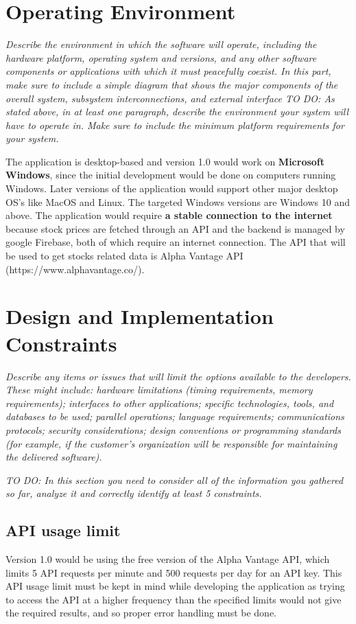 \documentclass[12 pt, a4paper]{report}
\begin{document}
	\section {Operating Environment}
	\textit{Describe the environment in which the software will operate, including the hardware platform, operating system and versions, and any other software components or applications with which it must peacefully coexist. In this part, make sure to include a simple diagram that shows the major components of the overall system, subsystem interconnections, and external interface
	TO DO: As stated above, in at least one paragraph, describe the environment your system will have to operate in. Make sure to include the minimum platform requirements for your system.}



	The application is desktop-based and version 1.0 would work on \textbf{Microsoft Windows}, since the initial development would be done on computers running Windows. Later versions of the application would support other major desktop OS's like MacOS and Linux. The targeted Windows versions are Windows 10 and above. The application would require \textbf{a stable connection to the internet} because stock prices are fetched through an API and the backend is managed by google Firebase, both of which require an internet connection. The API that will be used to get stocks related data is Alpha Vantage API (https://www.alphavantage.co/).
	
	\section {Design and Implementation Constraints}
	\textit{Describe any items or issues that will limit the options available to the developers. These might include: hardware limitations (timing requirements, memory requirements); interfaces to other applications; specific technologies, tools, and databases to be used; parallel operations; language requirements; communications protocols; security considerations; design conventions or programming standards (for example, if the customer’s organization will be responsible for maintaining the delivered software).}
	
	\textit{TO DO: In this section you need to consider all of the information you gathered so far, analyze it and correctly identify at least 5 constraints.}
	
	\subsection{API usage limit}
	Version 1.0 would be using the free version of the Alpha Vantage API, which limits 5 API requests per minute and 500 requests per day for an API key. This API usage limit must be kept in mind while developing the application as trying to access the API at a higher frequency than the specified limits would not give the required results, and so proper error handling must be done.
	
\end{document}
